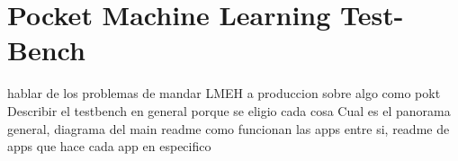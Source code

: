 \section{Pocket Machine Learning Test-Bench}\label{sec:c}

hablar de los problemas de mandar LMEH a produccion sobre algo como pokt
Describir el testbench en general
porque se eligio cada cosa
Cual es el panorama general, diagrama del main readme
como funcionan las apps entre si, readme de apps
que hace cada app en especifico
